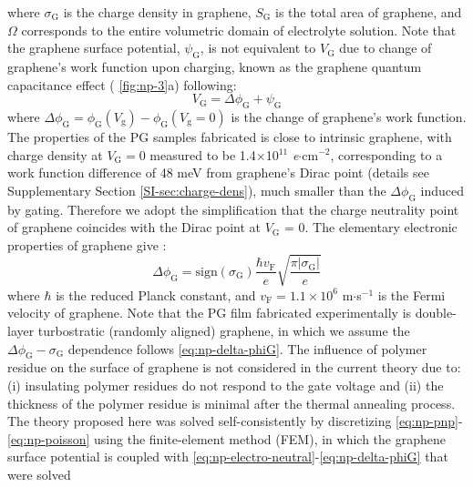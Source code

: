 where $\sigma_{\mathrm{G}}$ is the charge density in graphene,
$S_{\mathrm{G}}$ is the total area of graphene, and $\Omega$
corresponds to the entire volumetric domain of electrolyte
solution. Note that the graphene surface potential,
$\psi_{\mathrm{G}}$, is not equivalent to $V_{\mathrm{G}}$ due to
change of graphene's work function upon charging, known as the
graphene quantum capacitance effect\cite{Xia_2009_qc_measure} (
\autoref{fig:np-3}a) following:
\begin{equation}
  \label{eq:np-Vg}
  V_{\mathrm{G}} = \Delta \phi_{\mathrm{G}} + \psi_{\mathrm{G}}
\end{equation}
where
$\Delta \phi_{\mathrm{G}} = \phi_{\mathrm{G}}(V_{\mathrm{g}}) -
\phi_{\mathrm{G}}(V_{\mathrm{g}}=0)$ is the change of graphene’s work
function. The properties of the PG samples fabricated is close to
intrinsic graphene, with charge density at $V_{\mathrm{G}}=0$ measured
to be 1.4$\times$10$^{11}$ \textit{e}$\cdot$cm$^{-2}$, corresponding
to a work function difference of 48 meV from graphene's Dirac point
(details see Supplementary Section \autoref{SI-sec:charge-dens}), much
smaller than the $\Delta \phi_{\mathrm{G}}$ induced by gating.
Therefore we adopt the simplification that the charge neutrality point
of graphene coincides with the Dirac point at $V_{\mathrm{G}}$ =
0. The elementary electronic properties of graphene give
:
\begin{equation}
  \label{eq:np-delta-phiG}
  \Delta \phi_{\mathrm{G}} = \mathrm{sign}(\sigma_{\mathrm{G}}) \frac{\hbar v_{\mathrm{F}}}{e}
  \sqrt{\frac{\pi |\sigma_{\mathrm{G}}|}{e}}
\end{equation}
where $\hbar$ is the reduced Planck constant, and
$v_{\mathrm{F}}=1.1\times10^{6}$ m$\cdot$s$^{-1}$ is the Fermi
velocity of graphene.  Note that the PG film fabricated experimentally
is double-layer turbostratic (randomly aligned) graphene, in which we
assume the $\Delta \phi_{\mathrm{G}} - \sigma_{\mathrm{G}}$ dependence
follows  \autoref{eq:np-delta-phiG}. The influence of polymer residue on
the surface of graphene is not considered in the current theory due
to: (i) insulating polymer residues do not respond to the gate voltage
and (ii) the thickness of the polymer residue is minimal after the
thermal annealing process. The theory proposed here was solved
self-consistently by discretizing
 \autoref{eq:np-pnp}-\autoref{eq:np-poisson} using the finite-element method
(FEM), in which the graphene surface potential is coupled with
 \autoref{eq:np-electro-neutral}-\autoref{eq:np-delta-phiG} that were solved
